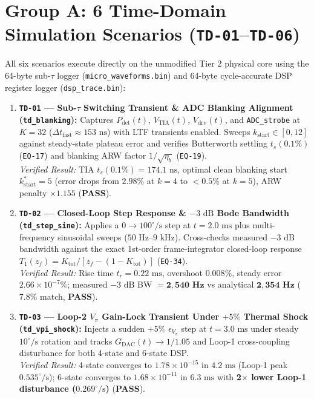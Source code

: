\documentclass[11pt,a4paper]{article}
\begin{document}
\section{Group A: 6 Time-Domain Simulation Scenarios (\texttt{TD-01}--\texttt{TD-06})}

All six scenarios execute directly on the unmodified Tier 2 physical core using the 64-byte sub-$\tau$ logger (\texttt{micro\_waveforms.bin}) and 64-byte cycle-accurate DSP register logger (\texttt{dsp\_trace.bin}):

\begin{enumerate}
    \item \textbf{\texttt{TD-01} --- Sub-$\tau$ Switching Transient \& ADC Blanking Alignment (\texttt{td\_blanking}):}
    Captures $P_{\text{det}}(t)$, $V_{\text{TIA}}(t)$, $V_{\text{drv}}(t)$, and \texttt{ADC\_strobe} at $K=32$ ($\Delta t_{\text{fast}} \approx 153\text{ ns}$) with LTF transients enabled. Sweeps $k_{\text{start}} \in [0, 12]$ against steady-state plateau error and verifies Butterworth settling $t_s(0.1\%)$ (\texttt{EQ-17}) and blanking ARW factor $1/\sqrt{\eta_b}$ (\texttt{EQ-19}).\\
    \emph{Verified Result:} TIA $t_s(0.1\%) = 174.1\text{ ns}$, optimal clean blanking start $k_{\text{start}}^* = 5$ (error drops from $2.98\%$ at $k=4$ to $<0.5\%$ at $k=5$), ARW penalty $\times 1.155$ (\textbf{PASS}).

    \item \textbf{\texttt{TD-02} --- Closed-Loop Step Response \& $-3\text{ dB}$ Bode Bandwidth (\texttt{td\_step\_sine}):}
    Applies a $0 \to 100^\circ/\text{s}$ step at $t=2.0\text{ ms}$ plus multi-frequency sinusoidal sweeps ($50\text{ Hz}$--$9\text{ kHz}$). Cross-checks measured $-3\text{ dB}$ bandwidth against the exact 1st-order frame-integrator closed-loop response $T_1(z_f) = K_{\text{tot}}/[z_f - (1-K_{\text{tot}})]$ (\texttt{EQ-34}).\\
    \emph{Verified Result:} Rise time $t_r = 0.22\text{ ms}$, overshoot $0.008\%$, steady error $2.66\times 10^{-7}\%$; measured $-3\text{ dB}$ BW $= \mathbf{2{,}540\text{ Hz}}$ vs analytical $\mathbf{2{,}354\text{ Hz}}$ ($7.8\%$ match, \textbf{PASS}).

    \item \textbf{\texttt{TD-03} --- Loop-2 $V_\pi$ Gain-Lock Transient Under $+5\%$ Thermal Shock (\texttt{td\_vpi\_shock}):}
    Injects a sudden $+5\%$ $\epsilon_{V_\pi}$ step at $t = 3.0\text{ ms}$ under steady $10^\circ/\text{s}$ rotation and tracks $G_{\text{DAC}}(t) \to 1/1.05$ and Loop-1 cross-coupling disturbance for both 4-state and 6-state DSP.\\
    \emph{Verified Result:} 4-state converges to $1.78\times 10^{-15}$ in $4.2\text{ ms}$ (Loop-1 peak $0.535^\circ/\text{s}$); 6-state converges to $1.68\times 10^{-11}$ in $6.3\text{ ms}$ with \textbf{2$\times$ lower Loop-1 disturbance ($0.269^\circ/\text{s}$)} (\textbf{PASS}).


\end{enumerate}
\end{document}
